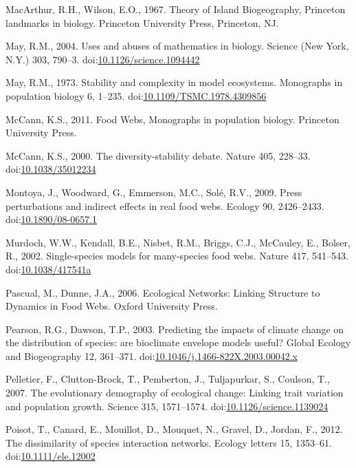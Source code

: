 \hypertarget{ref-MacArthur1967}{}
MacArthur, R.H., Wilson, E.O., 1967. Theory of Island Biogeography,
Princeton landmarks in biology. Princeton University Press, Princeton,
NJ.

\hypertarget{ref-May2004}{}
May, R.M., 2004. Uses and abuses of mathematics in biology. Science (New
York, N.Y.) 303, 790--3.
doi:\href{https://doi.org/10.1126/science.1094442}{10.1126/science.1094442}

\hypertarget{ref-May1973}{}
May, R.M., 1973. Stability and complexity in model ecosystems.
Monographs in population biology 6, 1--235.
doi:\href{https://doi.org/10.1109/TSMC.1978.4309856}{10.1109/TSMC.1978.4309856}

\hypertarget{ref-mccann2011food}{}
McCann, K.S., 2011. Food Webs, Monographs in population biology.
Princeton University Press.

\hypertarget{ref-McCann2000}{}
McCann, K.S., 2000. The diversity-stability debate. Nature 405, 228--33.
doi:\href{https://doi.org/10.1038/35012234}{10.1038/35012234}

\hypertarget{ref-Montoya2009}{}
Montoya, J., Woodward, G., Emmerson, M.C., Solé, R.V., 2009. Press
perturbations and indirect effects in real food webs. Ecology 90,
2426--2433.
doi:\href{https://doi.org/10.1890/08-0657.1}{10.1890/08-0657.1}

\hypertarget{ref-Murdoch2002}{}
Murdoch, W.W., Kendall, B.E., Nisbet, R.M., Briggs, C.J., McCauley, E.,
Bolser, R., 2002. Single-species models for many-species food webs.
Nature 417, 541--543.
doi:\href{https://doi.org/10.1038/417541a}{10.1038/417541a}

\hypertarget{ref-Pascual2006}{}
Pascual, M., Dunne, J.A., 2006. Ecological Networks: Linking Structure
to Dynamics in Food Webs. Oxford University Press.

\hypertarget{ref-Pearson2003}{}
Pearson, R.G., Dawson, T.P., 2003. Predicting the impacts of climate
change on the distribution of species: are bioclimate envelope models
useful? Global Ecology and Biogeography 12, 361--371.
doi:\href{https://doi.org/10.1046/j.1466-822X.2003.00042.x}{10.1046/j.1466-822X.2003.00042.x}

\hypertarget{ref-Pelletier2007}{}
Pelletier, F., Clutton-Brock, T., Pemberton, J., Tuljapurkar, S.,
Coulson, T., 2007. The evolutionary demography of ecological change:
Linking trait variation and population growth. Science 315, 1571--1574.
doi:\href{https://doi.org/10.1126/science.1139024}{10.1126/science.1139024}

\hypertarget{ref-Poisot2012}{}
Poisot, T., Canard, E., Mouillot, D., Mouquet, N., Gravel, D., Jordan,
F., 2012. The dissimilarity of species interaction networks. Ecology
letters 15, 1353--61.
doi:\href{https://doi.org/10.1111/ele.12002}{10.1111/ele.12002}

